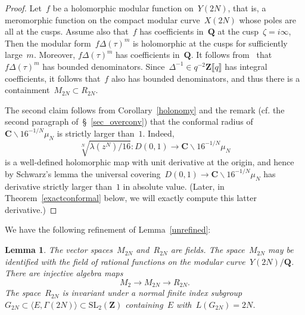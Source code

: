 \documentclass[10pt]{amsart}
\def\SSSS{\S}
\renewcommand\setminus{\smallsetminus}
\def\Z{\mathbf{Z}}
\def\Q{\mathbf{Q}}
\newtheorem{lemma}[subsubsection]{Lemma}
\theoremstyle{remark}
\numberwithin{equation}{subsection}
\def\C{\mathbf{C}}
\def\SL{\mathrm{SL}}
\begin{document}
\begin{proof} 
Let~$f$ be a holomorphic modular function on~$Y(2N)$, that is, a meromorphic function
on the compact modular curve~$X(2N)$ whose poles are all at the cusps. Assume also that~$f$ has
 coefficients in~$\Q$ at the cusp~$\zeta = i \infty$, Then the modular form~$f \Delta(\tau)^m$ is holomorphic at the cusps for
 sufficiently large~$m$. Moreover, $f \Delta(\tau)^m$ has coefficients in~$\Q$. It follows 
 from~\cite[Theorem~3.52]{Shimura} that~$f \Delta(\tau)^m$ has bounded denominators. Since~$\Delta^{-1} \in q^{-2} \Z \llbracket q \rrbracket$ has integral coefficients,  it follows that~$f$ also has bounded denominators,  and thus there is a containment~$M_{2N} \subset R_{2N}$.
 
The second claim follows from Corollary~\ref{holonomy} and the remark (cf. the second paragraph
of~\SSSS~\ref{sec_overconv}) that the conformal radius of $\C \setminus 16^{-1/N}\mu_N$ is strictly larger than~$1$. Indeed, 
$$\sqrt[N]{\lambda(z^N)/16} : D(0,1) \to \C \setminus 16^{-1/N}\mu_N$$
 is a well-defined holomorphic map with unit derivative at the origin, and hence
by Schwarz's lemma the universal covering~$D(0,1) \to \C \setminus 16^{-1/N}\mu_N$ has derivative strictly larger than~$1$ in absolute value. (Later, in Theorem~\ref{exactconformal} below, we will exactly compute this latter derivative.)
\end{proof}

We have the following refinement of Lemma~\ref{unrefined}:



\begin{lemma} \label{finiteness} 
The vector spaces~$M_{2N}$ and~$R_{2N}$ are fields.
The space~$M_{2N}$ may be identified with the field of rational functions on the modular curve~$Y(2N)/\Q$. 
There are injective algebra maps
$$M_2 \rightarrow M_{2N} \rightarrow R_{2N}.$$
The space~$R_{2N}$ is invariant under  a normal finite index subgroup~$G_{2N} \subset \langle E, \Gamma(2N)\rangle \subset  \SL_2(\Z)$ containing~$E$ 
with~$L(G_{2N}) = 2N$.
\end{lemma}
\end{document}
